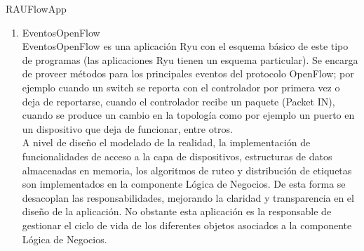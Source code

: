 \begin{subsubsection}{RAUFlowApp}





\begin{enumerate}

\item EventosOpenFlow\\
EventosOpenFlow es una aplicaci\'on Ryu con el esquema b\'asico de este tipo de programas (las aplicaciones Ryu tienen un esquema particular). Se encarga de proveer m\'etodos para los principales eventos del protocolo OpenFlow; por ejemplo cuando un switch se reporta con el controlador por primera vez o deja de reportarse, cuando el controlador recibe un paquete (Packet IN), cuando se produce un cambio en la topolog\'ia como por ejemplo un puerto en un dispositivo que deja de funcionar, entre otros.\\

A nivel de diseño el modelado de la realidad, la implementaci\'on de funcionalidades de acceso a la capa de dispositivos, estructuras de datos almacenadas en memoria, los algoritmos de ruteo y distribución de etiquetas son implementados en la componente Lógica de Negocios. De esta forma se desacoplan las responsabilidades, mejorando la claridad y transparencia en el diseño de la aplicaci\'on. No obstante esta aplicación es la responsable de gestionar el ciclo de vida de los diferentes objetos asociados a la componente Lógica de Negocios.
  

\end{enumerate}
\end{subsubsection}
